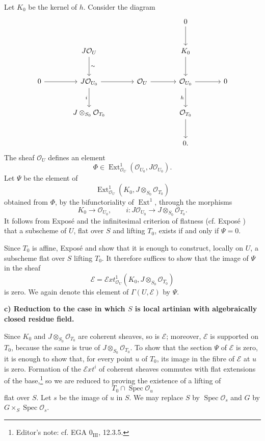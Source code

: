 Let \(K_0\) be the kernel of \(h\). Consider the diagram
\[
\begin{tikzcd}[column sep=large,row sep=large]
  &&& 0 \arrow[d] \\
  & J\mathcal O_U \arrow[d,"\sim"] && K_0 \arrow[d] \\
0 \arrow[r]
  & J\mathcal O_{U_0} \arrow[r] \arrow[d,"i"']
  & \mathcal O_U \arrow[r] & \mathcal O_{U_0}
      \arrow[r] \arrow[d,"h"'] & 0 \\
  & J\otimes_{S_0}\mathcal O_{T_0}
  && \mathcal O_{T_0} \arrow[d] \\
  &&& 0 .
\end{tikzcd}
\]
The sheaf \(\mathcal O_U\) defines an element
\[
  \Phi\in
  \operatorname{Ext}^{1}_{\mathcal O_U}
  (\mathcal O_{U_0},J\mathcal O_{U_0}).
\]
Let \(\Psi\) be the element of
\[
  \operatorname{Ext}^{1}_{\mathcal O_U}
  (K_0,J\otimes_{S_0}\mathcal O_{T_0})
\]
obtained from \(\Phi\), by the bifunctoriality of
\(\operatorname{Ext}^{1}\), through the morphisms
\[
  K_0\longrightarrow\mathcal O_{U_0},
  \qquad
  i:J\mathcal O_{U_0}
    \longrightarrow J\otimes_{S_0}\mathcal O_{T_0}.
\]
It follows from Exposé  and the infinitesimal criterion of
flatness (cf. Exposé ) that a subscheme of \(U\), flat over
\(S\) and lifting \(T_0\), exists if and only if \(\Psi=0\).

Since \(T_0\) is affine, Exposé  and  show that it is enough
to construct, locally on \(U\), a subscheme flat over \(S\) lifting
\(T_0\). It therefore suffices to show that the image of \(\Psi\) in
the sheaf
\[
  \mathscr E=
  \mathcal Ext^{1}_{\mathcal O_U}
  (K_0,J\otimes_{S_0}\mathcal O_{T_0})
\]
is zero. We again denote this element of
\(\Gamma(U,\mathscr E)\) by \(\Psi\).

\medskip\noindent\textbf{c) Reduction to the case in which \(S\) is
local artinian with algebraically closed residue field.}

Since \(K_0\) and \(J\otimes_{S_0}\mathcal O_{T_0}\) are coherent
sheaves, so is \(\mathscr E\); moreover, \(\mathscr E\) is supported
on \(T_0\), because the same is true of
\(J\otimes_{S_0}\mathcal O_{T_0}\). To show that the section \(\Psi\)
of \(\mathscr E\) is zero, it is enough to show that, for every point
\(u\) of \(T_0\), its image in the fibre of \(\mathscr E\) at \(u\)
is zero. Formation of the \(\mathcal Ext^i\) of coherent sheaves
commutes with flat extensions of the base,\footnote{Editor's note:
cf. EGA \(0_{\mathrm{III}}\), 12.3.5.} so we are reduced to proving the
existence of a lifting of
\[
  T_0\cap\operatorname{Spec}\mathcal O_u
\]
flat over \(S\). Let \(s\) be the image of \(u\) in \(S\). We may
replace \(S\) by \(\operatorname{Spec}\mathcal O_s\) and \(G\) by
\(G\times_S\operatorname{Spec}\mathcal O_s\).

